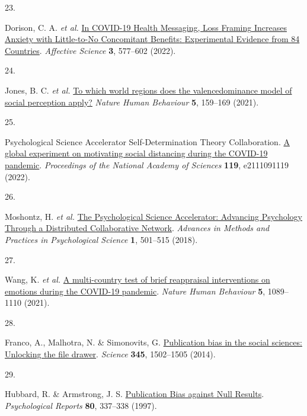 \documentclass[
  man,floatsintext]{apa6}
\newlength{\cslhangindent}
\newlength{\csllabelwidth}
\newlength{\cslentryspacingunit} %
\newenvironment{CSLReferences}[2] %
 {%
  \setlength{\parindent}{0pt}
  \ifodd #1
  \let\oldpar\par
  \def\par{\hangindent=\cslhangindent\oldpar}
  \fi
  \setlength{\parskip}{#2\cslentryspacingunit}
 }%
 {}
\newcommand{\CSLLeftMargin}[1]{\parbox[t]{\csllabelwidth}{#1}}
\newcommand{\CSLRightInline}[1]{\parbox[t]{\linewidth - \csllabelwidth}{#1}\break}
\begin{document}
\begin{CSLReferences}{0}{0}
\leavevmode{}%
\CSLLeftMargin{23. }%
\CSLRightInline{Dorison, C. A. \emph{et al.} \href{https://doi.org/10.1007/s42761-022-00128-3}{In {COVID}-19 {Health} {Messaging}, {Loss} {Framing} {Increases} {Anxiety} with {Little}-to-{No} {Concomitant} {Benefits}: {Experimental} {Evidence} from 84 {Countries}}. \emph{Affective Science} \textbf{3}, 577--602 (2022).}

\leavevmode{}%
\CSLLeftMargin{24. }%
\CSLRightInline{Jones, B. C. \emph{et al.} \href{https://doi.org/10.1038/s41562-020-01007-2}{To which world regions does the valence{\textendash}dominance model of social perception apply?} \emph{Nature Human Behaviour} \textbf{5}, 159--169 (2021).}

\leavevmode{}%
\CSLLeftMargin{25. }%
\CSLRightInline{Psychological Science Accelerator Self-Determination Theory Collaboration. \href{https://doi.org/10.1073/pnas.2111091119}{A global experiment on motivating social distancing during the COVID-19 pandemic}. \emph{Proceedings of the National Academy of Sciences} \textbf{119}, e2111091119 (2022).}

\leavevmode{}%
\CSLLeftMargin{26. }%
\CSLRightInline{Moshontz, H. \emph{et al.} \href{https://doi.org/10.1177/2515245918797607}{The Psychological Science Accelerator: Advancing Psychology Through a Distributed Collaborative Network}. \emph{Advances in Methods and Practices in Psychological Science} \textbf{1}, 501--515 (2018).}

\leavevmode{}%
\CSLLeftMargin{27. }%
\CSLRightInline{Wang, K. \emph{et al.} \href{https://doi.org/10.1038/s41562-021-01173-x}{A multi-country test of brief reappraisal interventions on emotions during the COVID-19 pandemic}. \emph{Nature Human Behaviour} \textbf{5}, 1089--1110 (2021).}

\leavevmode{}%
\CSLLeftMargin{28. }%
\CSLRightInline{Franco, A., Malhotra, N. \& Simonovits, G. \href{https://doi.org/10.1126/science.1255484}{Publication bias in the social sciences: Unlocking the file drawer}. \emph{Science} \textbf{345}, 1502--1505 (2014).}

\leavevmode{}%
\CSLLeftMargin{29. }%
\CSLRightInline{Hubbard, R. \& Armstrong, J. S. \href{https://doi.org/10.2466/pr0.1997.80.1.337}{Publication Bias against Null Results}. \emph{Psychological Reports} \textbf{80}, 337--338 (1997).}


\end{CSLReferences}
\end{document}
